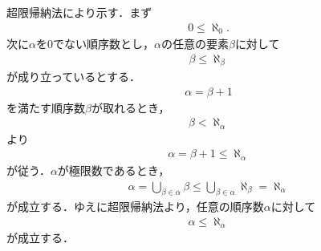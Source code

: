 	\begin{sketch}
		超限帰納法により示す．まず
		\begin{align}
			0 \leq \aleph_{0}.
		\end{align}
		次に$\alpha$を$0$でない順序数とし，$\alpha$の任意の要素$\beta$に対して
		\begin{align}
			\beta \leq \aleph_{\beta}
		\end{align}
		が成り立っているとする．
		\begin{align}
			\alpha = \beta + 1
		\end{align}
		を満たす順序数$\beta$が取れるとき，
		\begin{align}
			\beta < \aleph_{\alpha}
		\end{align}
		より
		\begin{align}
			\alpha = \beta + 1 \leq \aleph_{\alpha}
		\end{align}
		が従う．$\alpha$が極限数であるとき，
		\begin{align}
			\alpha = \bigcup_{\beta \in \alpha} \beta
			\leq \bigcup_{\beta \in \alpha} \aleph_{\beta}
			= \aleph_{\alpha}
		\end{align}
		が成立する．ゆえに超限帰納法より，任意の順序数$\alpha$に対して
		\begin{align}
			\alpha \leq \aleph_{\alpha}
		\end{align}
		が成立する．
		\QED
	\end{sketch}